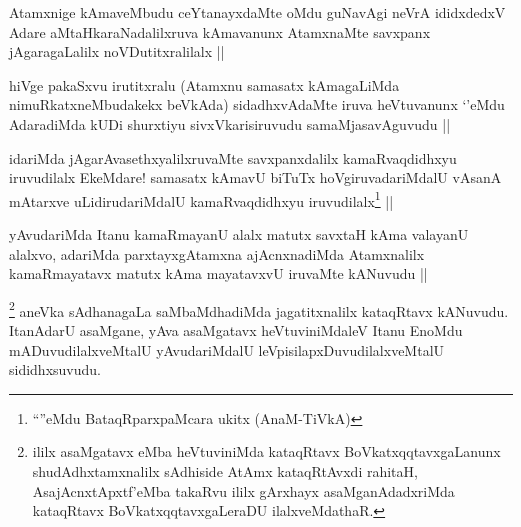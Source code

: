 \begin{artha}
Atamxnige kAmaveMbudu ceYtanayxdaMte oMdu guNavAgi neVrA ididxdedxV Adare aMtaHkaraNadalilxruva kAmavanunx AtamxnaMte savxpanx jAgaragaLalilx noVDutitxralilalx ||
\end{artha}

\begin{artha}
hiVge pakaSxvu irutitxralu (Atamxnu samasatx kAmagaLiMda nimuRkatxneMbudakekx beVkAda) sidadhxvAdaMte iruva heVtuvanunx `\stext'eMdu AdaradiMda kUDi shurxtiyu sivxVkarisiruvudu samaMjasavAguvudu ||
\end{artha}

\begin{artha}
idariMda jAgarAvasethxyalilxruvaMte savxpanxdalilx kamaRvaqdidhxyu iruvudilalx EkeMdare! samasatx kAmavU biTuTx hoVgiruvadariMdalU vAsanA mAtarxve uLidirudariMdalU kamaRvaqdidhxyu iruvudilalx\footnote{``\stext''eMdu BataqRparxpaMcara ukitx (AnaM-TiVkA)} ||
\end{artha}


\begin{artha}
yAvudariMda Itanu kamaRmayanU alalx matutx savxtaH kAma valayanU alalxvo, adariMda parxtayxgAtamxna ajAcnxnadiMda Atamxnalilx kamaRmayatavx matutx kAma mayatavxvU iruvaMte kANuvudu ||
\end{artha}

\begin{artha}
\footnote{ililx asaMgatavx eMba heVtuviniMda kataqRtavx BoVkatxqqtavxgaLanunx shudAdhxtamxnalilx sAdhiside AtAmx kataqRtAvxdi rahitaH, AsajAcnxtApxtf'eMba takaRvu ililx gArxhayx asaMganAdadxriMda kataqRtavx BoVkatxqqtavxgaLeraDU ilalxveMdathaR.}
aneVka sAdhanagaLa saMbaMdhadiMda jagatitxnalilx kataqRtavx kANuvudu. ItanAdarU asaMgane, yAva 
asaMgatavx heVtuviniMdaleV Itanu EnoMdu mADuvudilalxveMtalU yAvudariMdalU leVpisilapxDuvudilalxveMtalU sididhxsuvudu. 
\end{artha}


